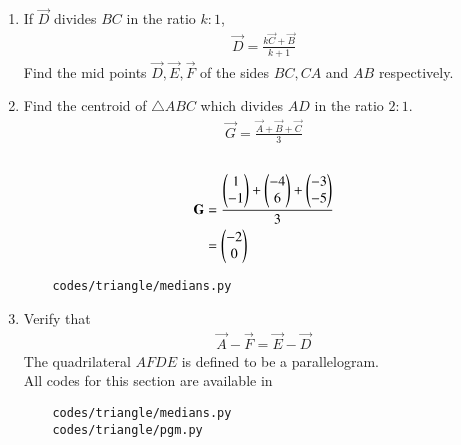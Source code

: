 \begin{enumerate}[label=\thesubsection.\arabic*.,ref=\thesubsection.\theenumi]
\item If $\vec{D}$ divides $BC$ in the ratio $k : 1$,
		\begin{align}
			\vec{D}= \frac{k\vec{C}+\vec{B}}{k+1}
	  \label{eq:app-section_formula}
		\end{align}
		Find the mid points $\vec{D}, \vec{E}, \vec{F}$ of the sides $BC, CA$ and $AB$ respectively.
	\\
		  
	\item Find the centroid  of $\triangle ABC$ which divides $AD$ in the ratio $2:1$.
		\begin{align}
			\vec{G}=\frac{\vec{A}+\vec{B}+\vec{C}}{3}
		\end{align}
   \\
\solution
\begin{equation}
\begin{split}
\label{eq:centroid}
    \mathbf{G}&= \frac{\begin{pmatrix}1\\-1\end{pmatrix}+\begin{pmatrix}-4\\6\end{pmatrix}+\begin{pmatrix}-3\\-5\end{pmatrix}}{3}\\    
     &= \begin{pmatrix}-2\\0\end{pmatrix}
\end{split}
\end{equation}
\begin{lstlisting}
	codes/triangle/medians.py
\end{lstlisting}
	\item Verify that 
		\begin{align}
\vec{A}-\vec{F}=\vec{E}-\vec{D}
		\end{align}
		The quadrilateral $AFDE$ is defined to be a parallelogram.\\
  		
All codes for this section are available in 
\begin{lstlisting}
	codes/triangle/medians.py
	codes/triangle/pgm.py
\end{lstlisting}
  
\end{enumerate}
